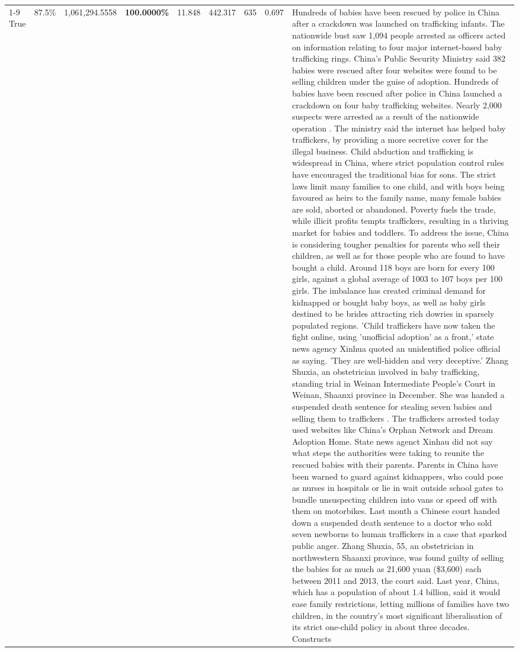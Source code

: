 \begin{table}[H]
\begin{tabular}{lllrlllll}
\cline{1-9}
True & 87.5\% & 1,061,294.5558 & \bfseries \color{red} 100.0000\% & 11.848 & 442.317 & 635 & 0.697 & Hundreds of babies have been rescued by police in China after a crackdown was launched on trafficking infants. The nationwide bust saw 1,094 people arrested as officers acted on information relating to four major internet-based baby trafficking rings. China's Public Security Ministry said 382 babies were rescued after four websites were found to be selling children under the guise of adoption. Hundreds of babies have been rescued after police in China launched a crackdown on four baby trafficking websites. Nearly 2,000 suspects were arrested as a result of the nationwide operation . The ministry said the internet has helped baby traffickers, by providing a more secretive cover for the illegal business. Child abduction and trafficking is widespread in China, where strict population control rules have encouraged the traditional bias for sons. The strict laws limit many families to one child, and with boys being favoured as heirs to the family name, many female babies are sold, aborted or abandoned. Poverty fuels the trade, while illicit profits tempts traffickers, resulting in a thriving market for babies and toddlers. To address the issue, China is considering tougher penalties for parents who sell their children, as well as for those people who are found to have bought a child. Around 118 boys are born for every 100 girls, against a global average of 1003 to 107 boys per 100 girls. The imbalance has created criminal demand for kidnapped or bought baby boys, as well as baby girls destined to be brides attracting rich dowries in sparsely populated regions. 'Child traffickers have now taken the fight online, using 'unofficial adoption' as a front,' state news agency Xinhua quoted an unidentified police official as saying. 'They are well-hidden and very deceptive.' Zhang Shuxia, an obstetrician involved in baby trafficking, standing trial in Weinan Intermediate People's Court in Weinan, Shaanxi province in December. She was handed a suspended death sentence for stealing seven babies and selling them to traffickers . The traffickers arrested today used websites like China's Orphan Network and Dream Adoption Home. State news agenct Xinhau did not say what steps the authorities were taking to reunite the rescued babies with their parents. Parents in China have been warned to guard against kidnappers, who could pose as nurses in hospitals or lie in wait outside school gates to bundle unsuspecting children into vans or speed off with them on motorbikes. Last month a Chinese court handed down a suspended death sentence to a doctor who sold seven newborns to human traffickers in a case that sparked public anger. Zhang Shuxia, 55, an obstetrician in northwestern Shaanxi province, was found guilty of selling the babies for as much as 21,600 yuan (\$3,600) each between 2011 and 2013, the court said. Last year, China, which has a population of about 1.4 billion, said it would ease family restrictions, letting millions of families have two children, in the country's most significant liberalisation of its strict one-child policy in about three decades. Constructs \\

\end{tabular}
\end{table}
